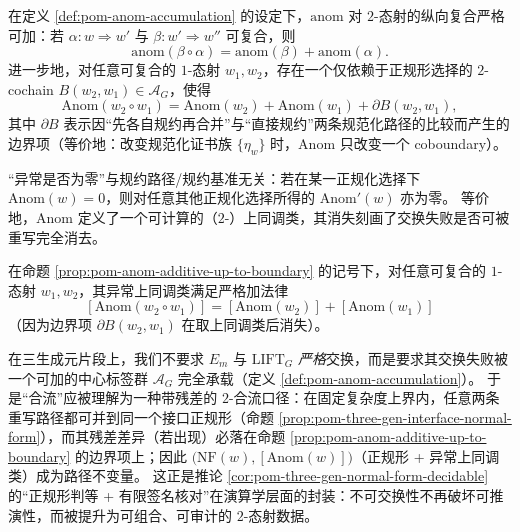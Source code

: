 \begin{proposition}[加法复合律与边界项]\label{prop:pom-anom-additive-up-to-boundary}
在定义 \ref{def:pom-anom-accumulation} 的设定下，\(\mathrm{anom}\) 对 \(2\)-态射的纵向复合严格可加：若 \(\alpha:w\Rightarrow w'\) 与 \(\beta:w'\Rightarrow w''\) 可复合，则
\[
\mathrm{anom}(\beta\circ\alpha)=\mathrm{anom}(\beta)+\mathrm{anom}(\alpha).
\]
进一步地，对任意可复合的 \(1\)-态射 \(w_1,w_2\)，存在一个仅依赖于正规形选择的 \(2\)-cochain \(B(w_2,w_1)\in\mathcal{A}_G\)，使得
\[
\mathrm{Anom}(w_2\circ w_1)
=
\mathrm{Anom}(w_2)+\mathrm{Anom}(w_1)+\partial B(w_2,w_1),
\]
其中 \(\partial B\) 表示因“先各自规约再合并”与“直接规约”两条规范化路径的比较而产生的边界项（等价地：改变规范化证书族 \(\{\eta_w\}\) 时，\(\mathrm{Anom}\) 只改变一个 coboundary）。
\end{proposition}

\begin{corollary}[零异常是路径不变量]\label{cor:pom-anom-cohomology-class}
“异常是否为零”与规约路径/规约基准无关：若在某一正规化选择下 \(\mathrm{Anom}(w)=0\)，则对任意其他正规化选择所得的 \(\mathrm{Anom}'(w)\) 亦为零。
等价地，\(\mathrm{Anom}\) 定义了一个可计算的（\(2\)-）上同调类，其消失刻画了交换失败是否可被重写完全消去。
\end{corollary}

\begin{corollary}\label{cor:pom-anom-class-additive}
在命题 \ref{prop:pom-anom-additive-up-to-boundary} 的记号下，对任意可复合的 \(1\)-态射 \(w_1,w_2\)，其异常上同调类满足严格加法律
\[
\boxed{\;
[\mathrm{Anom}(w_2\circ w_1)]
=
[\mathrm{Anom}(w_2)]
+
[\mathrm{Anom}(w_1)]\;}
\]
（因为边界项 \(\partial B(w_2,w_1)\) 在取上同调类后消失）。
\end{corollary}

\begin{remark}\label{rem:pom-residual-2confluence}
在三生成元片段上，我们不要求 \(E_m\) 与 \(\mathrm{LIFT}_G\) \emph{严格}交换，而是要求其交换失败被一个可加的中心标签群 \(\mathcal{A}_G\) 完全承载（定义 \ref{def:pom-anom-accumulation}）。
于是“合流”应被理解为一种带残差的 \(2\)-合流口径：在固定复杂度上界内，任意两条重写路径都可并到同一个接口正规形（命题 \ref{prop:pom-three-gen-interface-normal-form}），而其残差差异（若出现）必落在命题 \ref{prop:pom-anom-additive-up-to-boundary} 的边界项上；因此 \(\bigl(\mathrm{NF}(w),[\mathrm{Anom}(w)]\bigr)\)（正规形 + 异常上同调类）成为路径不变量。
这正是推论 \ref{cor:pom-three-gen-normal-form-decidable} 的“正规形判等 + 有限签名核对”在演算学层面的封装：不可交换性不再破坏可推演性，而被提升为可组合、可审计的 \(2\)-态射数据。
\end{remark}

